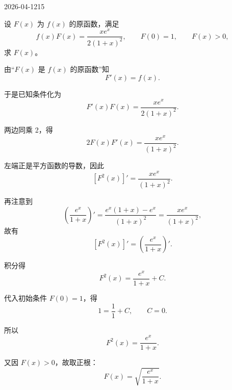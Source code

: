 \begin{mistake}{2026-04-12}{15}

\begin{problemcontent}
设 \(F(x)\) 为 \(f(x)\) 的原函数，满足
\[
f(x)F(x)=\frac{xe^x}{2(1+x)^2},
\qquad F(0)=1,
\qquad F(x)>0,
\]
求 \(F(x)\)。

\end{problemcontent}

\begin{solutioncontent}
由“\(F(x)\) 是 \(f(x)\) 的原函数”知
\[
F'(x)=f(x).
\]

于是已知条件化为
\[
F'(x)F(x)=\frac{xe^x}{2(1+x)^2}.
\]

两边同乘 2，得
\[
2F(x)F'(x)=\frac{xe^x}{(1+x)^2}.
\]

左端正是平方函数的导数，因此
\[
[F^2(x)]'=\frac{xe^x}{(1+x)^2}.
\]

再注意到
\[
\left(\frac{e^x}{1+x}\right)'
=\frac{e^x(1+x)-e^x}{(1+x)^2}
=\frac{xe^x}{(1+x)^2},
\]
故有
\[
[F^2(x)]'=\left(\frac{e^x}{1+x}\right)'.
\]

积分得
\[
F^2(x)=\frac{e^x}{1+x}+C.
\]

代入初始条件 \(F(0)=1\)，得
\[
1=\frac{1}{1}+C,
\qquad C=0.
\]

所以
\[
F^2(x)=\frac{e^x}{1+x}.
\]

又因 \(F(x)>0\)，故取正根：
\[
F(x)=\sqrt{\frac{e^x}{1+x}}.
\]

\end{solutioncontent}


\end{mistake}
